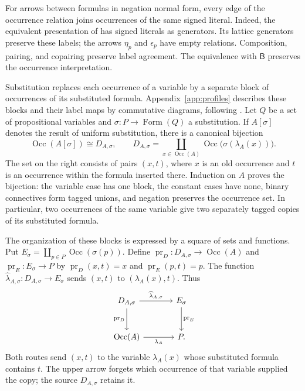 \documentclass[11pt]{article}
\newcommand{\B}{\mathsf B}
\newcommand{\Occ}{\operatorname{Occ}}
\newcommand{\FormulaSet}{\operatorname{Form}}
\begin{document}
For arrows between formulas in negation normal form, every edge of
the occurrence relation joins occurrences of the same signed literal.
Indeed, the equivalent presentation of \cite[\S14.2, pp.~318--321]{DP}
has signed literals as generators. Its lattice generators preserve
these labels; the arrows $\eta_p$ and $\epsilon_p$ have empty
relations. Composition, pairing, and copairing preserve label
agreement. The equivalence with $\B$ preserves the occurrence
interpretation.

Substitution replaces each occurrence of a variable by a separate
block of occurrences of its substituted formula.
Appendix~\ref{app:profiles} describes these blocks and their label maps
by commutative diagrams, following \cite[\S9]{Notation}.
Let $Q$ be a set of propositional variables and
$\sigma:P\to\FormulaSet(Q)$ a substitution. If $A[\sigma]$ denotes the
result of uniform substitution, there is a canonical bijection
\begin{equation}
 \Occ(A[\sigma])\cong D_{A,\sigma},\qquad
 D_{A,\sigma}=\coprod_{x\in\Occ(A)}
                  \Occ\bigl(\sigma(\lambda_A(x))\bigr).
 \label{eq:occ-substitution}
\end{equation}
The set on the right consists of pairs $(x,t)$, where $x$ is an old
occurrence and $t$ is an occurrence within the formula inserted there.
Induction on $A$ proves the bijection: the variable case has one
block, the constant cases have none, binary connectives form tagged
unions, and negation preserves the occurrence set. In particular,
two occurrences of the same variable give two separately tagged
copies of its substituted formula.

The organization of these blocks is expressed by a square of sets and
functions. Put $E_\sigma=\coprod_{p\in P}\Occ(\sigma(p))$.
Define $\operatorname{pr}_D:D_{A,\sigma}\to\Occ(A)$ and
$\operatorname{pr}_E:E_\sigma\to P$ by
$\operatorname{pr}_D(x,t)=x$ and $\operatorname{pr}_E(p,t)=p$.
The function
$\widehat\lambda_{A,\sigma}:D_{A,\sigma}\to E_\sigma$ sends
$(x,t)$ to $(\lambda_A(x),t)$. Thus
\begin{equation}
\begin{tikzcd}[column sep=large,row sep=large]
 D_{A,\sigma}\arrow[r,"\widehat\lambda_{A,\sigma}"]
   \arrow[d,"\operatorname{pr}_D"']
   &E_\sigma\arrow[d,"\operatorname{pr}_E"]\\
 \Occ(A)\arrow[r,"\lambda_A"']&P.
\end{tikzcd}
\label{eq:block-square}
\end{equation}
Both routes send $(x,t)$ to the variable $\lambda_A(x)$ whose
substituted formula contains $t$. The upper arrow forgets which
occurrence of that variable supplied the copy; the source $D_{A,\sigma}$
retains it.
\end{document}
